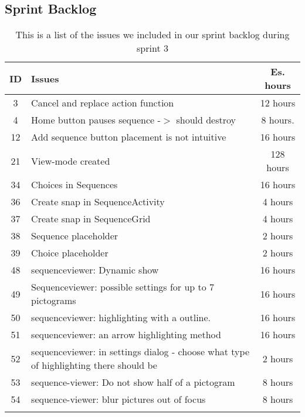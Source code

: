 \subsection{Sprint Backlog}\label{subsec:spr3_sprblog}
\begin{longtable} { | c | p{12cm} | c | } 
\hline
	ID 	&	Issues	&	Es. hours  \\\hline
	3	& 	Cancel and replace action function	&	12 hours \\\hline
	4	&	Home button pauses sequence -$>$ should destroy	&	8 hours.	\\\hline
	12	& 	Add sequence button placement is not intuitive	&	16 hours 	\\\hline
	21	& 	View-mode created				&	128 hours	\\\hline
	34	&	Choices in Sequences				& 	16 hours  \\\hline
	36	& 	Create snap in SequenceActivity		&	4 hours  \\\hline
	37	&	Create snap in SequenceGrid		& 	4 hours \\\hline
	38	& 	Sequence placeholder 			&	2 hours\\\hline
	39	&	Choice placeholder		 		&	2 hours \\\hline
	48	&	sequenceviewer: Dynamic show	 	&	16 hours \\\hline
	49	&	Sequenceviewer: possible settings for up to 7 pictograms	 & 	16 hours	\\\hline
	50	&	sequenceviewer: highlighting with a outline.	  &	16 hours \\\hline
	51	&	sequenceviewer: an arrow highlighting method	 &	16 hours \\\hline
	52	&	sequenceviewer: in settings dialog - choose what type of highlighting there should be	 &	2 hours \\\hline
	53	&	sequence-viewer: Do not show half of a pictogram	&	8 hours	\\\hline
	54	&	sequence-viewer: blur pictures out of focus		 &	8 hours \\\hline
\caption{This is a list of the issues we included in our sprint backlog during sprint 3}
\label{tab:spr3_prodblog}
\end{longtable}